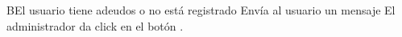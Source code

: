 		\begin{UCtrayectoriaA}{B}{El usuario tiene adeudos o no está registrado}
			\UCpaso[\UCsist] Envía al usuario un mensaje 
			\UCpaso[\UCsist] El administrador da click en el botón .
		\end{UCtrayectoriaA}
		


